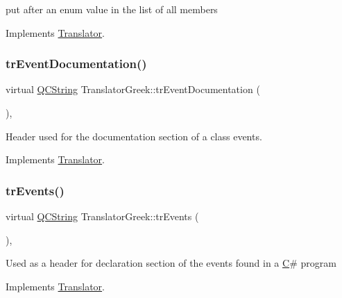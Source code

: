 put after an enum value in the list of all members 

Implements \mbox{\hyperlink{class_translator}{Translator}}.

\mbox{\label{class_translator_greek_a267fa4466f72a89df428d4fa1cc518b0}} 
\subsubsection{\texorpdfstring{trEventDocumentation()}{trEventDocumentation()}}
{\footnotesize\ttfamily virtual \mbox{\hyperlink{class_q_c_string}{Q\+C\+String}} Translator\+Greek\+::tr\+Event\+Documentation (\begin{DoxyParamCaption}{ }\end{DoxyParamCaption})\hspace{0.3cm}{\ttfamily [inline]}, {\ttfamily [virtual]}}

Header used for the documentation section of a class\textquotesingle{} events. 

Implements \mbox{\hyperlink{class_translator}{Translator}}.

\mbox{\label{class_translator_greek_a5df9b859596cb0b5836cbaf9c04d6572}} 
\subsubsection{\texorpdfstring{trEvents()}{trEvents()}}
{\footnotesize\ttfamily virtual \mbox{\hyperlink{class_q_c_string}{Q\+C\+String}} Translator\+Greek\+::tr\+Events (\begin{DoxyParamCaption}{ }\end{DoxyParamCaption})\hspace{0.3cm}{\ttfamily [inline]}, {\ttfamily [virtual]}}

Used as a header for declaration section of the events found in a \mbox{\hyperlink{class_c}{C}}\# program 

Implements \mbox{\hyperlink{class_translator}{Translator}}.

\mbox{\label{class_translator_greek_a13cb9634c1dc8804684f526ac7112400}} 
